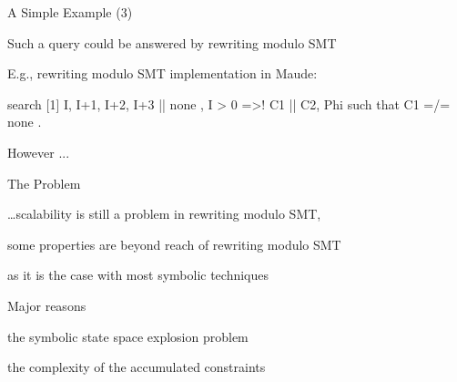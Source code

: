 \documentclass[11pt]{beamer}
\begin{document}
\begin{frame}[fragile]{A Simple Example (3)}
\begin{outeritemize}
    \item Such a query could be answered by rewriting modulo SMT 
    
    \item E.g., rewriting modulo SMT implementation in Maude:
    
    \begin{maude}
      search [1] { I, I+1, I+2, I+3 || none , I > 0 }
      =>! { C1 || C2, Phi } such that C1 =/= none .
    \end{maude}

    \pause
    \item However ...
\end{outeritemize}
\end{frame}



\begin{frame}{The Problem}
\begin{outeritemize}
    \item \ldots  \alert{scalability} is still a problem in
      rewriting modulo SMT, 
      
    \begin{inneritemize}
        \item some properties are beyond reach of rewriting modulo SMT
        \pause
        \item  as it is the case with most symbolic techniques
    \end{inneritemize}

    \pause
    \item Major reasons 
    
    \begin{inneritemize}
        \item the \alert{symbolic state space explosion problem}
        \item the \alert{complexity of the accumulated constraints}
    \end{inneritemize}

\end{outeritemize}
\end{frame}
\end{document}
